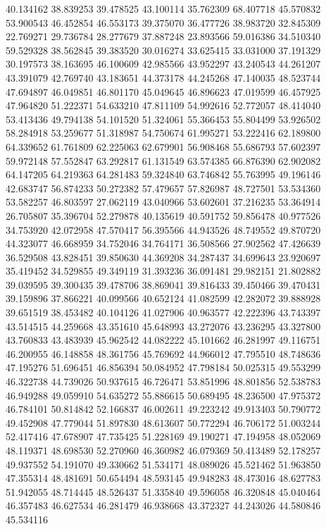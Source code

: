 40.134162
38.839253
39.478525
43.100114
35.762309
68.407718
45.570832
53.900543
46.452854
46.553173
39.375070
36.477726
38.983720
32.845309
22.769271
29.736784
28.277679
37.887248
23.893566
59.016386
34.510340
59.529328
38.562845
39.383520
30.016274
33.625415
33.031000
37.191329
30.197573
38.163695
46.100609
42.985566
43.952297
43.240543
44.261207
43.391079
42.769740
43.183651
44.373178
44.245268
47.140035
48.523744
47.694897
46.049851
46.801170
45.049645
46.896623
47.019599
46.457925
47.964820
51.222371
54.633210
47.811109
54.992616
52.772057
48.414040
53.413436
49.794138
54.101520
51.324061
55.366453
55.804499
53.926502
58.284918
53.259677
51.318987
54.750674
61.995271
53.222416
62.189800
64.339652
61.761809
62.225063
62.679901
56.908468
55.686793
57.602397
59.972148
57.552847
63.292817
61.131549
63.574385
66.876390
62.902082
64.147205
64.219363
64.281483
59.324840
63.746842
55.763995
49.196146
42.683747
56.874233
50.272382
57.479657
57.826987
48.727501
53.534360
53.582257
46.803597
27.062119
43.040966
53.602601
37.216235
53.364914
26.705807
35.396704
52.279878
40.135619
40.591752
59.856478
40.977526
34.753920
42.072958
47.570417
56.395566
44.943526
48.749552
49.870720
44.323077
46.668959
34.752046
34.764171
36.508566
27.902562
47.426639
36.529508
43.828451
39.850630
44.369208
34.287437
34.699643
23.920697
35.419452
34.529855
49.349119
31.393236
36.091481
29.982151
21.802882
39.039595
39.300435
39.478706
38.869041
39.816433
39.450466
39.470431
39.159896
37.866221
40.099566
40.652124
41.082599
42.282072
39.888928
39.651519
38.453482
40.104126
41.027906
40.963577
42.222396
43.743397
43.514515
44.259668
43.351610
45.648993
43.272076
43.236295
43.327800
43.760833
43.483939
45.962542
44.082222
45.101662
46.281997
49.116751
46.200955
46.148858
48.361756
45.769692
44.966012
47.795510
48.748636
47.195276
51.696451
46.856394
50.084952
47.798184
50.025315
49.553299
46.322738
44.739026
50.937615
46.726471
53.851996
48.801856
52.538783
46.949288
49.059910
54.635272
55.886615
50.689495
48.236500
47.975372
46.784101
50.814842
52.166837
46.002611
49.223242
49.913403
50.790772
49.452908
47.779044
51.897830
48.613607
50.772294
46.706172
51.003244
52.417416
47.678907
47.735425
51.228169
49.190271
47.194958
48.052069
48.119371
48.698530
52.270960
46.360982
46.079369
50.413489
52.178257
49.937552
54.191070
49.330662
51.534171
48.089026
45.521462
51.963850
47.355314
48.481691
50.654494
48.593145
49.948283
48.473016
48.627783
51.942055
48.714445
48.526437
51.335840
49.596058
46.320848
45.040464
46.357483
46.627534
46.281479
46.938668
43.372327
44.243026
44.580846
45.534116
